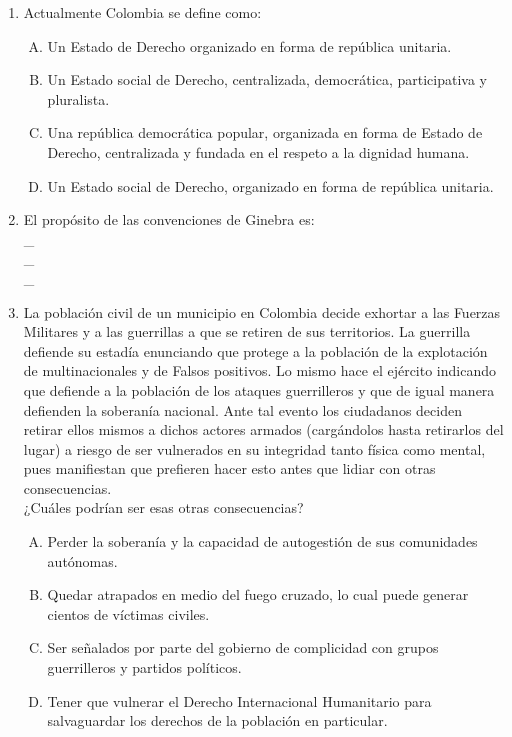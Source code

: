 \begin{enumerate}

\item Actualmente Colombia se define como:\label{sociii-15}
\begin{enumerate}[(A)]
\item   Un Estado de Derecho organizado en forma de república unitaria.
 \item  Un Estado social de Derecho, centralizada, democrática, participativa y pluralista.
\item Una república democrática popular, organizada en forma de Estado de Derecho, centralizada y fundada en el respeto a la dignidad humana.
\item Un Estado social de Derecho, organizado en forma de república unitaria.
\end{enumerate}

\newpage
\item El propósito de las convenciones de Ginebra es:\label{sociii-13}\hrulefill\\
\_\hrulefill\\
\_\hrulefill\\
\_\hrulefill

\item La población civil de un municipio en Colombia decide exhortar a las Fuerzas Militares y a las guerrillas a que se retiren de sus territorios. La guerrilla defiende su estadía enunciando que protege a la población de la explotación de multinacionales y de Falsos positivos. Lo mismo hace el ejército indicando que defiende a la población de los ataques guerrilleros y que de igual manera defienden la soberanía nacional. Ante tal evento los ciudadanos deciden retirar ellos mismos a dichos actores armados (cargándolos hasta retirarlos del lugar) a riesgo de ser vulnerados en su integridad tanto física como mental, pues manifiestan que prefieren hacer esto antes que lidiar con otras consecuencias. \label{sociii-12}\\

¿Cuáles podrían ser esas otras consecuencias?
\begin{enumerate}[(A)]
\item   Perder la soberanía y la capacidad de autogestión de sus comunidades autónomas.
 \item  Quedar atrapados en medio del fuego cruzado, lo cual puede generar cientos de víctimas civiles.
\item Ser señalados por parte del gobierno de complicidad con grupos guerrilleros y partidos políticos.
\item Tener que vulnerar el Derecho Internacional Humanitario para salvaguardar los derechos de la población en particular.
\end{enumerate}



\end{enumerate}
